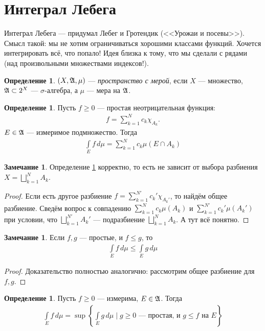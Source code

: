 \documentclass[a4paper,14pt]{extarticle}
\newcounter{theoremCnt}
\theoremstyle{definition}
\newtheorem{df}[theoremCnt]{Определение}
\theoremstyle{plain}
\theoremstyle{plain}
\theoremstyle{plain}
\theoremstyle{plain}
\theoremstyle{definition}
\theoremstyle{definition}
\newtheorem{remrk}[theoremCnt]{Замечание}
\theoremstyle{definition}
\theoremstyle{definition}
\theoremstyle{definition}
\theoremstyle{definition}
\theoremstyle{plain}
\theoremstyle{plain}
\theoremstyle{plain}
\theoremstyle{plain}
\theoremstyle{definition}
\theoremstyle{definition}
\theoremstyle{definition}
\theoremstyle{definition}
\theoremstyle{definition}
\newcommand{\A}{\ensuremath \mathfrak{A}}
\begin{document}
\section{Интеграл Лебега}

Интеграл Лебега --- придумал Лебег и Гротендик (<<Урожаи и посевы>>). Смысл такой: мы не хотим ограничиваться хорошими классами функций. Хочется интегрировать всё, что попало! Идея близка к тому, что мы сделали с рядами (над произвольными множествами индексов!).

\begin{df}
 $(X, \A, \mu)$ --- \textit{пространство с мерой}, если $X$ --- множество, $\A \subset 2^{X}$ --- $\sigma$-алгебра, а $\mu$ --- мера на $\A$.
\end{df}
\begin{df}
 \label{definition:integral_simple_positive}
 Пусть $f \geqslant 0$ --- простая неотрицательная функция: \begin{align*}
  f = \sum_{k=1}^{N} c_k \chi_{A_k}
 .\end{align*}  $E \in \A$ --- измеримое подмножество.  Тогда \begin{align*}
  \int\limits_{E} f \, d\mu = \sum_{k=1}^{N} c_k \mu (E \cap A_k)
 \end{align*} 
\end{df}
\begin{remrk}
 Определение \ref{definition:integral_simple_positive} корректно, то есть не зависит от выбора разбиения $X = \bigsqcup_{k=1}^{N} A_k$.
\end{remrk}
\begin{proof}
 Если есть другое разбиение $f = \sum_{k=1}^{N'} c_k' \chi_{A_k'}$, то найдём общее разбиение. Сведём вопрос к совпадению $\sum_{k=1}^{N} c_k \mu (A_k)$ и $\sum_{k=1}^{N'} c_k' \mu (A_k')$ при условии, что $\bigsqcup_{k=1}^{N'} A_k' $ --- подразбиение $\bigsqcup_{k=1}^{N} A_k$. А тут всё понятно.
\end{proof}
\begin{remrk}
 Если $f,g$ --- простые, и $f \leqslant g$, то \begin{align*}
  \int\limits_E f \, d\mu \leqslant \int\limits_E g\, d\mu
 \end{align*} 
\end{remrk}
\begin{proof}
 Доказательство полностью аналогично: рассмотрим общее разбиение для $f,g$.
\end{proof}
\begin{df}
 Пусть $f \geqslant 0$ --- измерима, $E \in \A$. Тогда \begin{align*}
  \int\limits_E f \, d\mu = \sup \left\{ \int\limits_E g\, d\mu \mid g \geqslant 0 \text{ --- простая, и } g \leqslant f \text{ на } E \right\}
 \end{align*} 
\end{df}
\end{document}
